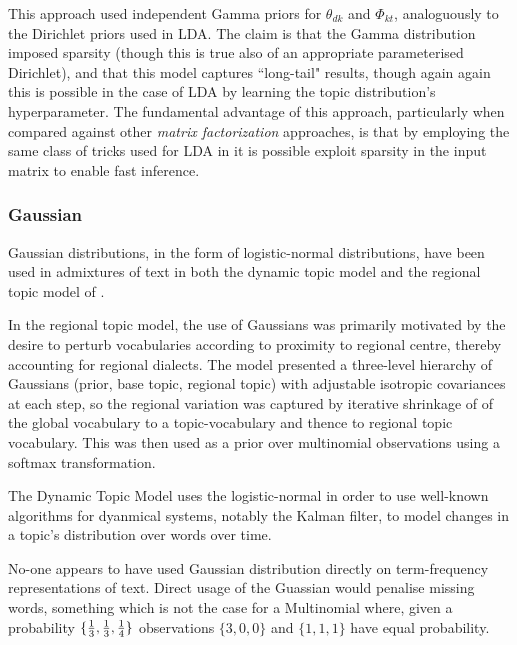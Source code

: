 This approach used independent Gamma priors for $\theta_{dk}$ and $\Phi_{kt}$, analoguously to the Dirichlet priors used in LDA. The claim is that the Gamma distribution imposed sparsity (though this is true also of an appropriate parameterised Dirichlet), and that this model captures ``long-tail" results, though again again this is possible in the case of LDA by learning the topic distribution's hyperparameter\cite{Wallach2009a}. The fundamental advantage of this approach, particularly when compared against other \emph{matrix factorization} approaches, is that by employing the same class of tricks used for LDA in \cite{Mimno2012a} it is possible exploit sparsity in the input matrix to enable fast inference.

\subsubsection{Gaussian}

Gaussian distributions, in the form of logistic-normal distributions, have been used in admixtures of text in both the dynamic topic model\cite{Blei2006a} and the regional topic model of \cite{Eisenstein2010}.

In the regional topic model, the use of Gaussians was primarily motivated by the desire to perturb vocabularies according to proximity to regional centre, thereby accounting for regional dialects. The model presented a three-level hierarchy of Gaussians (prior, base topic, regional topic) with adjustable isotropic covariances at each step, so the regional variation was captured by iterative shrinkage of of the global vocabulary to a topic-vocabulary and thence to regional topic vocabulary. This was then used as a prior over multinomial observations using a softmax transformation.

The Dynamic Topic Model uses the logistic-normal in order to use well-known algorithms for dyanmical systems, notably the Kalman filter, to model changes in a topic's distribution over words over time.

No-one appears to have used Gaussian distribution directly on term-frequency representations of text. Direct usage of the Guassian would penalise missing words, something which is not the case for a Multinomial where, given a probability $\{\frac{1}{ {3} }, \frac{1}{ {3} }, \frac{1}{ {4} }\}$ observations $\{3,0,0\}$ and $\{1,1,1\}$ have equal probability.

